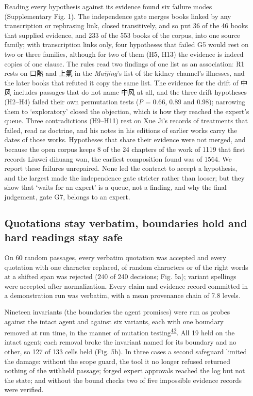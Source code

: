 \documentclass[
]{article}
\begin{document}
Reading every hypothesis against its evidence found six failure modes
(Supplementary Fig. 1). The independence gate merges books linked by any
transcription or rephrasing link, closed transitively, and so put 36 of
the 46 books that supplied evidence, and 233 of the 553 books of the
corpus, into one source family; with transcription links only, four
hypotheses that failed G5 would rest on two or three families, although
for two of them (H5, H13) the evidence is indeed copies of one clause.
The rules read two findings of one list as an association: R1 rests on
口熱 and 上氣 in the \emph{Maijing}'s list of the kidney channel's
illnesses, and the later books that refuted it copy the same list. The
evidence for the drift of 中风 includes passages that do not name 中风
at all, and the three drift hypotheses (H2--H4) failed their own
permutation tests (\emph{P} = 0.66, 0.89 and 0.98); narrowing them to
`exploratory' closed the objection, which is how they reached the
expert's queue. Three contradictions (H9--H11) rest on Xue Ji's records
of treatments that failed, read as doctrine, and his notes in his
editions of earlier works carry the dates of those works. Hypotheses
that share their evidence were not merged, and because the open corpus
keeps 8 of the 24 chapters of the work of 1119 that first records Liuwei
dihuang wan, the earliest composition found was of 1564. We report these
failures unrepaired. None led the contract to accept a hypothesis, and
the largest made the independence gate stricter rather than looser; but
they show that `waits for an expert' is a queue, not a finding, and why
the final judgement, gate G7, belongs to an expert.

\hypertarget{quotations-stay-verbatim-boundaries-hold-and-hard-readings-stay-safe}{%
\subsection{Quotations stay verbatim, boundaries hold and hard readings
stay
safe}\label{quotations-stay-verbatim-boundaries-hold-and-hard-readings-stay-safe}}

On 60 random passages, every verbatim quotation was accepted and every
quotation with one character replaced, of random characters or of the
right words at a shifted span was rejected (240 of 240 decisions; Fig.
5a); variant spellings were accepted after normalization. Every claim
and evidence record committed in a demonstration run was verbatim, with
a mean provenance chain of 7.8 levels.

Nineteen invariants (the boundaries the agent promises) were run as
probes against the intact agent and against six variants, each with one
boundary removed at run time, in the manner of mutation
testing\textsuperscript{\protect\hyperlink{ref-jia2011mutation}{42}}.
All 19 held on the intact agent; each removal broke the invariant named
for its boundary and no other, so 127 of 133 cells held (Fig. 5b). In
three cases a second safeguard limited the damage: without the scope
guard, the tool it no longer refused returned nothing of the withheld
passage; forged expert approvals reached the log but not the state; and
without the bound checks two of five impossible evidence records were
verified.
\end{document}
